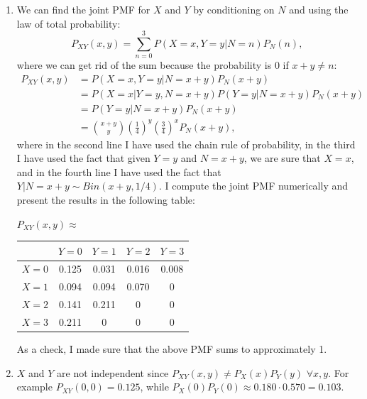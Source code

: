 \begin{problem}{11}
\begin{enumerate}
\item 

We can find the joint PMF for $X$ and $Y$ by conditioning on $N$ and using the law of total probability:
\begin{equation*}
P_{XY}(x, y) = \sum_{n=0}^3 P(X=x, Y=y|N=n)P_N(n),
\end{equation*}
where we can get rid of the sum because the probability is 0 if $x+y \ne n$:
\begin{align*}
P_{XY}(x, y) &=P(X=x, Y=y|N=x+y)P_N(x+y) \\
& = P(X=x|Y=y, N=x+y) P(Y=y|N=x+y)P_N(x+y) \\
& = P(Y=y|N=x+y)P_N(x+y) \\
& = \binom{x+y}{y}\left (\frac{1}{4} \right)^{y}\left (\frac{3}{4} \right)^{x} P_N(x+y),
\end{align*}
where in the second line I have used the chain rule of probability, in the third I have used the fact that given $Y=y$ and $N=x+y$, we are sure that $X=x$, and in the fourth line I have used the fact that $Y|N=x+y \sim Bin(x+y, 1/4)$.  I compute the joint PMF numerically and present the results in the following table:
\begin{center}
$P_{XY}(x, y) \approx $
\bgroup
\def\arraystretch{2.5}
 \begin{tabular}{ | c | c | c | c | c |}
    \hline
     & $Y=0$ & $Y=1$ & $Y=2$ & $Y=3$ \\  \hline
     $X=0$ &  0.125 &  0.031  &  0.016 &  0.008 \\ \hline
     $X=1$ & 0.094  &  0.094  &  0.070 &  0 \\ \hline
     $X=2$ &  0.141 &  0.211 &  0 &  0 \\ \hline
     $X=3$ & 0.211 &  0 &  0 &  0  \\
    \hline 
  \end{tabular}
  \egroup
\end{center}
As a check, I made sure that the above PMF sums to approximately 1.

\item $X$ and $Y$ are not independent since $P_{XY}(x, y) \ne  P_{X}(x) P_{Y}(y)$ $\forall x, y$.  For example $P_{XY}(0, 0) =0.125$, while $P_{X}(0)P_{Y}(0) \approx 0.180 \cdot 0.570 = 0.103$.

\end{enumerate}

\end{problem}


